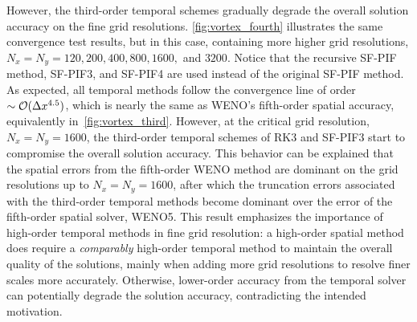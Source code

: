 However, the third-order temporal schemes gradually degrade the overall solution accuracy
on the fine grid resolutions. \cref{fig:vortex_fourth} illustrates the same convergence test results,
but in this case, containing more higher grid resolutions, \( N_{x} = N_{y} = 120, 200, 400, 800, 1600, \) and \( 3200 \).
Notice that the recursive SF-PIF method, SF-PIF3, and SF-PIF4 are used instead of the original SF-PIF method.
As expected, all temporal methods follow the convergence line of order \( \sim \mathcal{O}(\Delta x^{4.5}) \),
which is nearly the same as WENO's fifth-order spatial accuracy, equivalently in~\cref{fig:vortex_third}.
However, at the critical grid resolution, \( N_{x} = N_{y} = 1600 \),
the third-order temporal schemes of RK3 and SF-PIF3 start to compromise the overall solution accuracy.
This behavior can be explained that the spatial errors from the fifth-order WENO method
are dominant on the grid resolutions up to \( N_{x} = N_{y} = 1600 \),
after which the truncation errors associated with the third-order temporal methods
become dominant over the error of the fifth-order spatial solver, WENO5.
This result emphasizes the importance of high-order temporal methods in fine grid resolution:
a high-order spatial method does require a \textit{comparably} high-order temporal method
to maintain the overall quality of the solutions,
mainly when adding more grid resolutions to resolve finer scales more accurately.
Otherwise, lower-order accuracy from the temporal solver can potentially degrade
the solution accuracy, contradicting the intended motivation.

